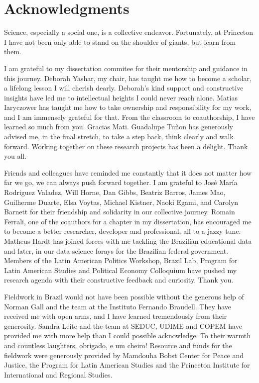 
\section*{Acknowledgments}

Science, especially a social one, is a collective endeavor. Fortunately, at Princeton I have not been only able to stand on the shoulder of giants, but learn from them. 

I am grateful to my dissertation commitee for their mentorship and guidance in this journey. Deborah Yashar, my chair, has taught me how to become a scholar, a lifelong lesson I will cherish dearly. Deborah's kind support and constructive insights have led me to intellectual heights I could never reach alone. Matias Iaryczower has taught me how to take ownership and responsibility for my work, and I am immensely grateful for that. From the classroom to coauthorship, I have learned so much from you. Gracias Mati. Guadalupe Tu\~{n}on has generously advised me, in the final stretch, to take a step back, think clearly and walk forward. Working together on these research projects has been a delight. Thank you all.

Friends and colleagues have reminded me constantly that it does not matter how far we go, we can always push forward together. I am grateful to Jos\'{e} Mar\'{i}a Rodriguez Valadez, Will Horne, Dan Gibbs, Beatriz Barros, James Mao, Guilherme Duarte, Elsa Voytas, Michael Kistner, Naoki Egami, and Carolyn Barnett for their friendship and solidarity in our collective journey. Romain Ferrali, one of the coauthors for a chapter in my dissertation, has encouraged me to become a better researcher, developer and professional, all to a jazzy tune. Matheus Hardt has joined forces with me tackling the Brazilian educational data and later, in our data science forays for the Brazilian federal government. Members of the Latin American Politics Workshop, Brazil Lab, Program for Latin American Studies and Political Economy Colloquium have pushed my research agenda with their constructive feedback and curiosity. Thank you.

Fieldwork in Brazil would not have been possible without the generous help of Norman Gall and the team at the Instituto Fernando Braudell. They have received me with open arms, and I have learned tremendously from their generosity. Sandra Leite and the team at SEDUC, UDIME and COPEM have provided me with more help than I could possible acknowledge. To their warmth and countless laughters, obrigado, e um cheiro! Resource and funds for the fieldwork were generously provided by Mamdouha Bobst Center for Peace and Justice, the Program for Latin American Studies and the Princeton Institute for International and Regional Studies.

